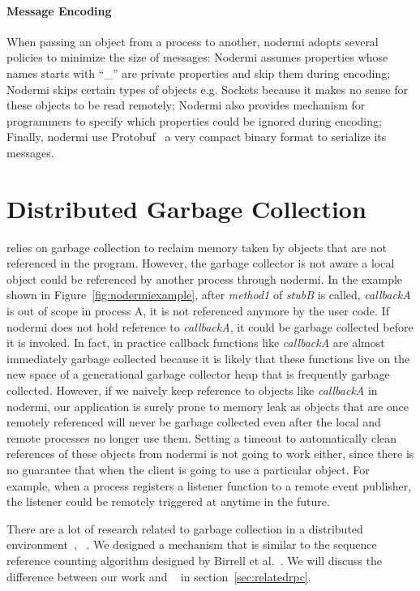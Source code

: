\paragraph{Message Encoding}
When passing an object from a process to another,
nodermi adopts several policies to minimize the size of messages:
Nodermi assumes properties whose names starts with ``_'' are private properties
and skip them during encoding;
Nodermi skips certain types of objects e.g. Sockets because
it makes no sense for these objects to be read remotely;
Nodermi also provides mechanism for programmers to specify which
properties could be ignored during encoding;
Finally, nodermi use Protobuf~\cite{protobuf} a very compact binary format 
to serialize its messages.


\section{Distributed Garbage Collection}
\js{} relies on garbage collection to reclaim memory taken by
objects that are not referenced in the program.
However, the garbage collector is not aware a local object
could be referenced by another process through nodermi.
In the example shown in Figure~\ref{fig:nodermiexample},
after \emph{method1} of \emph{stubB} is called,
\emph{callbackA} is out of scope in process A,
it is not referenced anymore by the user code.
If nodermi does not hold reference to \emph{callbackA},
it could be garbage collected before it is invoked.
In fact, in practice callback functions like \emph{callbackA} are almost
immediately garbage collected because it is likely that these functions
live on the new space of a generational garbage collector heap that is frequently
garbage collected.
However, if we naively keep reference to objects like
 \emph{callbackA} in nodermi,
our application is surely prone to memory leak
as objects that are once remotely referenced
will never be garbage collected even after the local and remote processes
no longer use them.
Setting a timeout to automatically clean references of
these objects from nodermi is not going to work either,
since there is no guarantee that when the client is going to use a
particular object.
For example,
when a process registers a listener function to a remote event publisher,
the listener could be remotely triggered at anytime in the future.


There are a lot of research related to garbage collection in a distributed
environment~\cite{abdullahi1998garbage}, ~\cite{birrell1993distributed}.
We designed a mechanism that is similar to the sequence reference counting algorithm
designed by Birrell et al.~\cite{birrell1993distributed}.
We will discuss the difference between our work and ~\cite{birrell1993distributed}
in section~\ref{sec:relatedrpc}.

